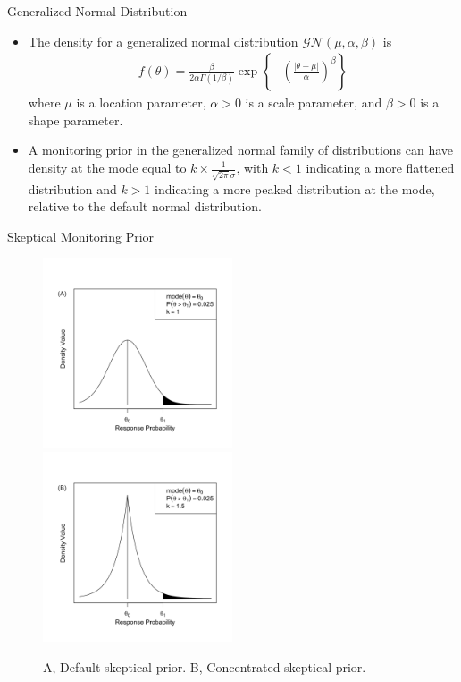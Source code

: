 \documentclass{beamer}
\begin{document}
\begin{frame}{Generalized Normal Distribution}
\begin{itemize}
\item 
The density for a generalized normal distribution $\mathcal{GN}(\mu,\alpha,\beta)$ is
\begin{align*}
f(\theta)=\frac{\beta}{2\alpha\Gamma(1/\beta)}\exp\left\{-\left(\frac{|\theta-\mu|}{\alpha}\right)^\beta\right\}
\end{align*} where $\mu$ is a location parameter, $\alpha>0$ is a scale parameter, and $\beta>0$ is a shape parameter. 
\item
A monitoring prior in the generalized normal family of distributions can have density at the mode equal to $k\times \frac{1}{\sqrt{2\pi}\sigma}$, with $k<1$ indicating a more flattened distribution and $k>1$ indicating a more peaked distribution at the mode, relative to the default normal distribution. 
\end{itemize}
\end{frame}

\begin{frame}{Skeptical Monitoring Prior}
\begin{figure}[htbp]
\begin{center}
\includegraphics[width=0.5\textwidth]{./figures/figure1a.png}%
\includegraphics[width=0.5\textwidth]{./figures/figure1b.png}
\caption{A, Default skeptical prior. B, Concentrated skeptical prior.}

\label{fig:figure1}
\end{center}
\end{figure}
\end{frame}
\end{document}
